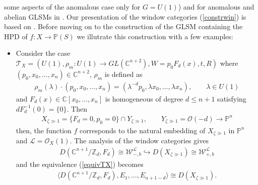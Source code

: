 \documentclass[a4paper,11pt]{article}
\numberwithin{equation}{section}
\begin{document}
some aspects of the anomalous case only for $G=U(1)$) and for anomalous and 
abelian GLSMs in \cite{Clingempeel:2018iub}. Our presentation of the window 
categories (\ref{constrwin}) is based on \cite{Clingempeel:2018iub}. Before 
moving on to the construction of the GLSM containing the HPD of $f:X\rightarrow 
\mathbb{P}(S)$ we illutrate this construction with a few examples:
\begin{itemize}
 \item Consider the case $\mathcal{T}_{X}=(U(1),\rho_{m}:U(1)\rightarrow 
GL(\mathbb{C}^{n+2}),W=p_{0}F_{d}(x),t,R)$ where 
$(p_{0},x_{0},\ldots,x_{n})\in \mathbb{C}^{n+2}$, $\rho_{m}$ is defined as
\begin{eqnarray}
\rho_{m}(\lambda)\cdot 
(p_{0},x_{0},\ldots,x_{n})=(\lambda^{-d}p_{0},\lambda x_{0},\ldots,\lambda 
x_{n}),\qquad \lambda\in U(1)
\end{eqnarray}
and $F_{d}(x)\in\mathbb{C}[x_{0},\ldots,x_{n}]$ is homogeneous of degree 
$d\leq n+1$ satisfying $dF_{d}^{-1}(0)=\{ 0\}$. Then
\begin{eqnarray}
X_{\zeta\gg 1}=\{F_{d}=0,p_{0}=0\}\cap Y_{\zeta\gg 1},\qquad  Y_{\zeta\gg 
1}=\mathcal{O}(-d)\rightarrow \mathbb{P}^{n}
\end{eqnarray}
then, the function $f$ corresponds to the natural embedding of $X_{\zeta\gg 1}$ 
in $\mathbb{P}^{n}$ and $\mathcal{L}=\mathcal{O}_{X}(1)$. The analysis of the 
window categories gives 
\cite{ballard2019variation,Hori:2013ika,hori2019notes,Clingempeel:2018iub}
\begin{eqnarray}
D(\mathbb{C}^{n+1}/\mathbb{Z}_{d},F_{d})\cong\mathcal{W}^{\mathcal{L}}_{-,b}
\hookrightarrow 
D(X_{\zeta\gg 1})\cong\mathcal{W}^{\mathcal{L}}_{+,b} 
\end{eqnarray}
and the equivalence (\ref{equivTX}) becomes
\begin{eqnarray}
\langle 
D(\mathbb{C}^{n+1}/\mathbb{Z}_{d},F_{d}),E_{1},\ldots, 
E_{n+1-d}\rangle\cong
D(X_{\zeta\gg 1}).
\end{eqnarray}


\end{itemize}
\end{document}
